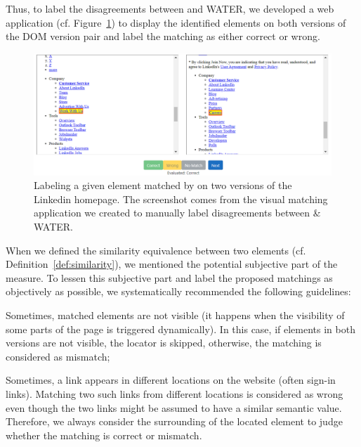 Thus, to label the disagreements between \erratum{} and WATER, we developed a web application (cf. Figure~\ref{fig:disagreement}) to display the identified elements on both versions of the DOM version pair and label the matching as either correct or wrong.

\begin{figure}
  \begin{center}
  \includegraphics[width=1.1\linewidth]{erratum/disagreement}
  \caption{Labeling a given element matched by \erratum{} on two versions of the \textsf{Linkedin} homepage. The screenshot comes from the visual matching application we created to manually label disagreements between \erratum{} \& WATER.}
  \label{fig:disagreement}
  \end{center}
\end{figure}

When we defined the similarity equivalence between two elements (cf. Definition~\ref{def:similarity}), we mentioned the potential subjective part of the measure.
To lessen this subjective part and label the proposed matchings as objectively as possible, we systematically recommended the following guidelines:
\begin{compactenum}
    \item Sometimes, matched elements are not visible (it happens when the visibility of some parts of the page is triggered dynamically).
    In this case, if elements in both versions are not visible, the locator is skipped, otherwise, the matching is considered as \textsf{mismatch};
    \item Sometimes, a link appears in different locations on the website (often sign-in links).
    Matching two such links from different locations is considered as wrong even though the two links might be assumed to have a similar semantic value.
    Therefore, we always consider the surrounding of the located element to judge whether the matching is \textsf{correct} or \textsf{mismatch}.
\end{compactenum}

